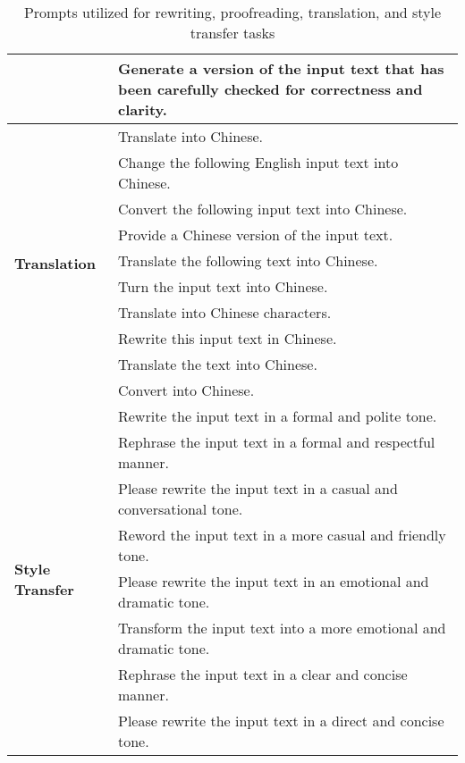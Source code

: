\begin{table*}[]
{\begin{tabular}{l|l}
                                         & Generate a version of the input text that has been carefully checked for correctness and clarity. \\ \hline
\multirow{10}{*}{\textbf{Translation}}    & Translate into Chinese. \\
                                         & Change the following English input text into Chinese. \\
                                         & Convert the following input text into Chinese. \\
                                         & Provide a Chinese version of the input text. \\
                                         & Translate the following text into Chinese. \\
                                         & Turn the input text into Chinese. \\
                                         & Translate into Chinese characters. \\
                                         & Rewrite this input text in Chinese. \\
                                         & Translate the text into Chinese. \\
                                         & Convert into Chinese. \\ \hline
\multirow{8}{*}{\textbf{Style Transfer}} & Rewrite the input text in a formal and polite tone. \\
                                         & Rephrase the input text in a formal and respectful manner. \\
                                         & Please rewrite the input text in a casual and conversational tone. \\
                                         & Reword the input text in a more casual and friendly tone. \\
                                         & Please rewrite the input text in an emotional and dramatic tone. \\
                                         & Transform the input text into a more emotional and dramatic tone. \\
                                         & Rephrase the input text in a clear and concise manner. \\
                                         & Please rewrite the input text in a direct and concise tone. \\ \hline \hline
\end{tabular}
}
\caption{Prompts utilized for rewriting, proofreading, translation, and style transfer tasks}
\label{Table_taskprompts}
\end{table*}
